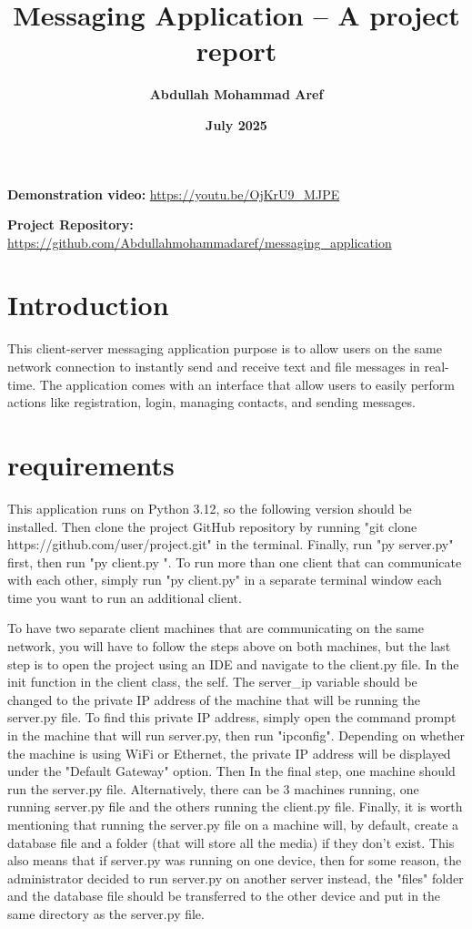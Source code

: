 \documentclass{article}
\title{\fontsize{19}{10}\textbf{Messaging Application – A project report}}
\author{\textbf{Abdullah Mohammad Aref}}
\date{\textbf{July 2025}}
\begin{document}
\maketitle

\begin{flushleft}
    
    \textbf{Demonstration video:}
    \url{https://youtu.be/OjKrU9_MJPE}
    
    
    \textbf{Project Repository:}
    \url{https://github.com/Abdullahmohammadaref/messaging_application}
    
\end{flushleft}

\tableofcontents

\section{Introduction}

This client-server messaging application purpose is to allow users on the same network connection to instantly send and receive text and file messages in real-time. The application comes with an interface that allow users to easily perform actions like registration, login, managing contacts, and sending messages.

\section{requirements}

This application runs on Python 3.12, so the following version should be installed. Then clone the project GitHub repository by running "git clone https://github.com/user/project.git" in the terminal. Finally, run "py server.py" first, then run "py client.py ". To run more than one client that can communicate with each other, simply run "py client.py" in a separate terminal window each time you want to run an additional client.


To have two separate client machines that are communicating on the same network, you will have to follow the steps above on both machines, but the last step is to open the project using an IDE and navigate to the client.py file. In the init function in the client class, the self. The server\_ip variable should be changed to the private IP address of the machine that will be running the server.py file. To find this private IP address, simply open the command prompt in the machine that will run server.py, then run "ipconfig". Depending on whether the machine is using WiFi or Ethernet, the private IP address will be displayed under the "Default Gateway" option. Then In the final step, one machine should run the server.py file. Alternatively, there can be 3 machines running, one running server.py file and the others running the client.py file. Finally, it is worth mentioning that running the server.py file on a machine will, by default, create a database file and a folder (that will store all the media) if they don't exist. This also means that if server.py was running on one device, then for some reason, the administrator decided to run server.py on another server instead, the "files" folder and the database file should be transferred to the other device and put in the same directory as the server.py file.
\end{document}
